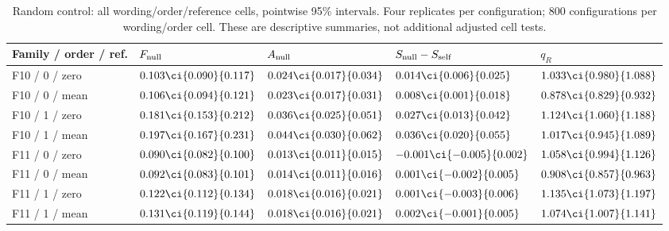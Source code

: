 \begin{table}[H]
\centering\footnotesize
\setlength{\tabcolsep}{3pt}
\caption{Random control: all wording/order/reference cells, pointwise 95\% intervals. Four replicates per configuration; 800 configurations per wording/order cell. These are descriptive summaries, not additional adjusted cell tests.}
\label{tab:null-cells-random}
\begin{tabularx}{\linewidth}{@{}lYYYY@{}}
\toprule
Family / order / ref. & $F_{\rm null}$ & $A_{\rm null}$ & $S_{\rm null}-S_{\rm self}$ & $q_R$ \\
\midrule
F10 / 0 / zero & $0.103\ci{0.090}{0.117}$ & $0.024\ci{0.017}{0.034}$ & $0.014\ci{0.006}{0.025}$ & $1.033\ci{0.980}{1.088}$ \\
F10 / 0 / mean & $0.106\ci{0.094}{0.121}$ & $0.023\ci{0.017}{0.031}$ & $0.008\ci{0.001}{0.018}$ & $0.878\ci{0.829}{0.932}$ \\
F10 / 1 / zero & $0.181\ci{0.153}{0.212}$ & $0.036\ci{0.025}{0.051}$ & $0.027\ci{0.013}{0.042}$ & $1.124\ci{1.060}{1.188}$ \\
F10 / 1 / mean & $0.197\ci{0.167}{0.231}$ & $0.044\ci{0.030}{0.062}$ & $0.036\ci{0.020}{0.055}$ & $1.017\ci{0.945}{1.089}$ \\
F11 / 0 / zero & $0.090\ci{0.082}{0.100}$ & $0.013\ci{0.011}{0.015}$ & $-0.001\ci{-0.005}{0.002}$ & $1.058\ci{0.994}{1.126}$ \\
F11 / 0 / mean & $0.092\ci{0.083}{0.101}$ & $0.014\ci{0.011}{0.016}$ & $0.001\ci{-0.002}{0.005}$ & $0.908\ci{0.857}{0.963}$ \\
F11 / 1 / zero & $0.122\ci{0.112}{0.134}$ & $0.018\ci{0.016}{0.021}$ & $0.001\ci{-0.003}{0.006}$ & $1.135\ci{1.073}{1.197}$ \\
F11 / 1 / mean & $0.131\ci{0.119}{0.144}$ & $0.018\ci{0.016}{0.021}$ & $0.002\ci{-0.001}{0.005}$ & $1.074\ci{1.007}{1.141}$ \\
\bottomrule
\end{tabularx}
\end{table}

